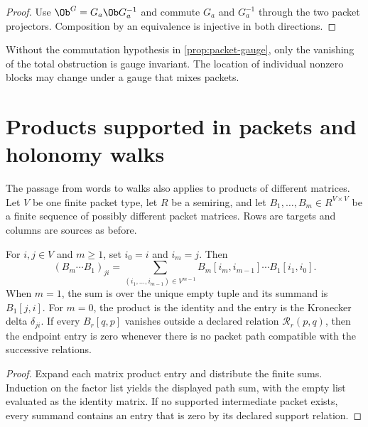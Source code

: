 \begin{proof}
Use $\Ob^G=G_a\Ob G_a^{-1}$ and commute $G_a$ and $G_a^{-1}$ through the
two packet projectors.  Composition by an equivalence is injective in both
directions.
\end{proof}

\begin{boundary}
Without the commutation hypothesis in \cref{prop:packet-gauge}, only the
vanishing of the total obstruction is gauge invariant.  The location of
individual nonzero blocks may change under a gauge that mixes packets.
\end{boundary}

\section{Products supported in packets and holonomy walks}
\label{sec:holonomy-walks}

The passage from words to walks also applies to products of different matrices.
Let $V$
be one finite packet type, let $R$ be a semiring, and let
$B_1,\ldots,B_m\in R^{V\times V}$ be a finite sequence of possibly different
packet matrices.  Rows are targets and columns are sources as before.

\begin{proposition}
\label{prop:heterogeneous-path}
For $i,j\in V$ and $m\geq1$, set $i_0=i$ and $i_m=j$.  Then
\[
\boxed{
(B_m\cdots B_1)_{ji}
=
\sum_{(i_1,\ldots,i_{m-1})\in V^{m-1}}
  B_m[i_m,i_{m-1}]\cdots B_1[i_1,i_0].
}
\]
When $m=1$, the sum is over the unique empty tuple and its summand is
$B_1[j,i]$.
For $m=0$, the product is the identity and the entry is the Kronecker delta
$\delta_{ji}$.  If every $B_r[q,p]$ vanishes outside a declared relation
$\mathcal R_r(p,q)$, then the endpoint entry is zero whenever there is no
packet path compatible with the successive relations.
\end{proposition}

\begin{proof}
Expand each matrix product entry and distribute the finite sums.  Induction on
the factor list yields the displayed path sum, with the empty list evaluated
as the identity matrix.  If no supported intermediate packet exists, every
summand contains an entry that is zero by its declared support relation.
\end{proof}

